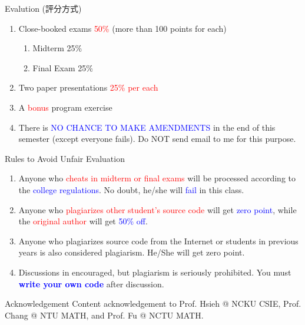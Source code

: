 \documentclass[aspectratio=169, 14pt, UTF8, t]{beamer}
\let\olditem\item
\renewcommand\item{\olditem\justifying}
\begin{document}
\begin{frame}{Evalution (評分方式)}
  \begin{enumerate}
    \item Close-booked exams \textcolor{red}{50\%} (more than 100 points for each)
          \begin{enumerate}
            \item Midterm 25\%
            \item Final Exam 25\%
          \end{enumerate}
    \item Two paper presentations \textcolor{red}{25\% per each}
    \item A \textcolor{red}{bonus} program exercise
    \item There is \textcolor{blue}{NO CHANCE TO MAKE AMENDMENTS} in the end of this semester (except everyone fails). Do NOT send email to me for this purpose.
  \end{enumerate}
\end{frame}

\begin{frame}{Rules to Avoid Unfair Evaluation}
  \begin{enumerate}
    \item Anyone who \textcolor{red}{cheats in midterm or final exams} will be processed according to the \textcolor{blue}{college regulations}. No doubt, he/she will \textcolor{blue}{fail} in this class.
    \item Anyone who \textcolor{red}{plagiarizes other student's source code} will get \textcolor{blue}{zero point}, while the \textcolor{red}{original author} will get \textcolor{blue}{50\% off}.
    \item Anyone who plagiarizes source code from the Internet or students in previous years is also considered plagiarism. He/She will get zero point.
    \item Discussions in encouraged, but plagiarism is seriously prohibited. You must \textcolor{blue}{\textbf{write your own code}} after discussion.
  \end{enumerate}
\end{frame}

\begin{frame}{Acknowledgement}
  Content acknowledgement to Prof. Hsieh @ NCKU CSIE, Prof. Chang @ NTU MATH, and Prof. Fu @ NCTU MATH.
\end{frame}
\end{document}
